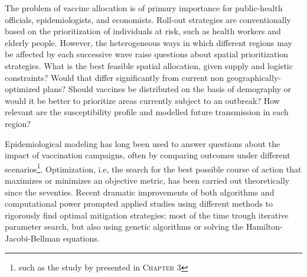 The problem of vaccine allocation is of primary importance for  public-health officials, epidemiologists, and economists\cite[-7.5\baselineskip]{Emanuel:EthicalFrameworkGlobal:2020, Lipsitch:UnderstandingCOVID19Vaccine:2020}. 
Roll-out strategies are conventionally based on the prioritization of individuals at risk, such as health workers and elderly people\cite[-6.5\baselineskip]{Bubar:ModelinformedCOVID19Vaccine:2021,Fitzpatrick:OptimizingAgespecificVaccination:2021,Baden:EfficacySafetyMRNA1273:2020,Yang:WhoShouldBe:2021}. However, the heterogeneous ways in which different regions may be affected by each successive wave raise questions about spatial prioritization strategies. What is the best feasible spatial allocation, given supply and logistic constraints? Would that differ significantly from current non geographically-optimized plans? Should vaccines be distributed on the basis of demography or would it be better to prioritize areas currently subject to an outbreak? How relevant are the susceptibility profile and modelled future transmission in each region? 

Epidemiological modeling has long been used to answer questions about the impact of vaccination campaigns, often by comparing outcomes under different scenarios\footnote[][-9.3\baselineskip]{such as the study by \textcite{Lee:AchievingCoordinatedNational:2020} presented in \textsc{Chapter 3}}. Optimization, i.e, the search for the best possible course of action that maximizes or minimizes an objective metric, has been carried out theoretically since the seventies. Recent dramatic improvements of both algorithms\cite[-8.5\baselineskip]{Quirynen:MultipleShootingMicrosecond:2015} and computational power prompted applied studies using different methods to rigorously find optimal mitigation strategies: most of the time trough iterative parameter search, but also using genetic algorithms or solving the Hamilton-Jacobi-Bellman equations.

